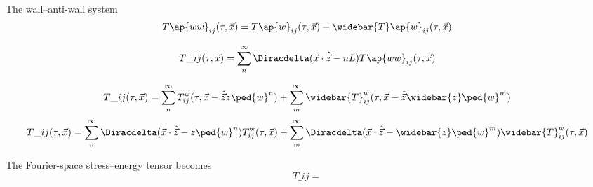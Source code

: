 \begin{draft}





    


    \hlineSep


    The wall--anti-wall system
    \begin{equation}
        T\ap{ww}_{ij}(\tau, \vec{x}) = T\ap{w}_{ij}(\tau, \vec{x}) + \widebar{T}\ap{w}_{ij}(\tau, \vec{x})
    \end{equation}

    \begin{equation}
        T\_{ij}(\tau, \vec{x}) = \sum_{n}^{\infty}\Diracdelta(\vec{x}\cdot\hat{\vec{z}} -nL)  T\ap{ww}_{ij}(\tau, \vec{x})
    \end{equation}


    \begin{equation}
        T\_{ij}(\tau, \vec{x}) = \sum_{n}^{\infty} T^{\mathrm{w}}_{ij} (\tau, \vec{x}-\hat{\vec{z}}z\ped{w}^n ) + \sum_{m}^{\infty} \widebar{T}^{\mathrm{w}}_{ij} (\tau, \vec{x}-\hat{\vec{z}}\widebar{z}\ped{w}^m ) 
    \end{equation}
    \begin{equation}
        T\_{ij}(\tau, \vec{x}) = %
        \sum_{n}^{\infty} \Diracdelta(\vec{x}\cdot\hat{\vec{z}} -z\ped{w}^n) T^{\mathrm{w}}_{ij} (\tau, \vec{x}) 
        + \sum_{m}^{\infty} \Diracdelta(\vec{x}\cdot\hat{\vec{z}} -\widebar{z}\ped{w}^m) \widebar{T}^{\mathrm{w}}_{ij} (\tau, \vec{x}) 
    \end{equation}

    The Fourier-space stress--energy tensor becomes
    \begin{equation}
        T\_{ij} = 
    \end{equation}
\end{draft}




